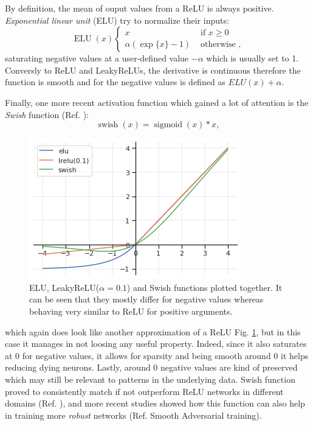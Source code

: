 \documentclass[LaM,binding=0.6cm]{./packages/sapthesis/sapthesis}
\begin{document}
            By definition, the mean of ouput values from a ReLU is always positive. \textit{Exponential linear unit} (ELU) try to normalize their inputs:
            \begin{equation}
                \operatorname{ELU}(x)\left\{\begin{array}{ll}
                    x & \text { if } x \geq 0 \\
                    \alpha(\exp \{x\}-1) & \text { otherwise },
                    \end{array}\right.
            \end{equation}
            saturating negative values at a user-defined value $- \alpha$ which is usually set to 1. Conversly to ReLU and LeakyReLUs, the derivative is continuous
            therefore the function is smooth and for the negative values is defined as $ELU(x) + \alpha$.

            Finally, one more recent activation function which gained a lot of attention is the \textit{Swish} function (Ref. ):
            \begin{equation}
                \operatorname{swish}(x)= \operatorname{sigmoid}(x) * x,
            \end{equation}
            
            \begin{figure}[hb!]
                \centering
                \includegraphics[scale=0.50]{afunctions}
                \caption{ELU, LeakyReLU($\alpha=0.1$) and Swish functions plotted together. It can be seen that they mostly differ for negative values whereas behaving very similar to ReLU for positive arguments.}
                \label{fig:afuncs}
            \end{figure}
            which again does look like another approximation of a ReLU Fig. \ref{fig:afuncs}, but in this case it manages in not loosing any useful property. Indeed, since
            it also saturates at 0 for negative values, it allows for sparsity and being smooth around 0 it helps reducing dying neurons. Lastly, around 0 negative 
            values are kind of preserved which may still be relevant to patterns in the underlying data.
            Swish function proved to consistently match if not outperform ReLU networks in different domains (Ref. ), and more recent studies showed how this function
            can also help in training more \textit{robust} networks (Ref. Smooth Adversarial training).
\end{document}
